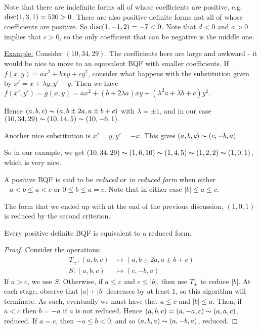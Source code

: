 \documentclass[10pt,a4paper]{article}
\begin{document}
Note that there are indefinite forms all of whose coefficients are positive, e.g. $\operatorname{disc}(1,3,1) = 520 > 0$. There are also positive definite forms not all of whose coefficients are positive. So $\operatorname{disc}(1,-1,2) = -7 < 0$. Note that $d < 0$ and $a>0$ implies that $c>0$, so the only coefficient that can be negative is the middle one.

\underline{Example:} Consider $(10,34,29)$. The coefficients here are large and awkward - it would be nice to move to an equivalent BQF with smaller coefficients. If $f(x,y) = ax^2 + bxy + cy^2$, consider what happens with the substitution given by $x' = x+ \lambda y, y' + y$. Then we have $f(x', y') = g(x, y) = ax^2 + (b+2\lambda a) xy + (\lambda^2a + \lambda b +c)y^2.$

Hence $(a,b,c) \thicksim (a, b\pm 2a, a\pm b + c)$ with $\lambda = \pm 1$, and in our case $(10, 34, 29) \thicksim (10, 14, 5) \thicksim (10,-6,1).$

Another nice substitution is $x' = y, y' = -x$. This gives $(a,b,c) \thicksim (c, -b, a)$

So in our example, we get $(10, 34, 29) \thicksim (1, 6, 10) \thicksim (1, 4, 5) \thicksim (1, 2, 2) \thicksim (1, 0, 1)$, which is very nice. 

A positive BQF is said to be \emph{reduced} or \emph{in reduced form} when either $-a < b \leq a < c$ or $0 \leq b \leq a = c$. Note that in either case $|b| \leq a \leq c$.

The form that we ended up with at the end of the previous discussion, $(1,0,1)$ is reduced by the second criterion.

\begin{proposition}
Every positive definite BQF is equivalent to a reduced form.
\end{proposition}
\begin{proof}
Consider the operations:
\begin{align*}
T_{\pm}:(a,b,c)&\mapsto (a, b\pm 2a, a\pm b +c)\\
S:(a,b,c)&\mapsto (c, -b, a)
\end{align*}
If $a>c$, we use $S$. Otherwise, if $a \leq c$ and $c \leq |b|$, then use $T_{\pm}$ to reduce $|b|$. At each stage, observe that $|a|+|b|$ decreases by at least $1$, so this algorithm will terminate. As such, eventually we must have that $a \leq c$ and $|b| \leq a$. Then, if $a <c$ then $b = -a$ if $a$ is not reduced. Hence $(a,b,c) = (a,-a,c) \thicksim (a,a,c)$, reduced. If $a =c$, then $-a \leq b < 0$, and so $(a,b,a) \thicksim (a,-b,a)$, reduced.
\end{proof}
\end{document}
